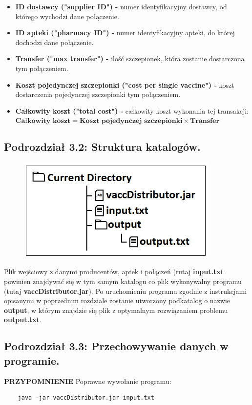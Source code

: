 \documentclass[a4paper]{article}
\newcommand\tab[1][1cm]{\hspace*{#1}}
\begin{document}
\begin{enumerate}
\begin{itemize}
              \item \textbf{ID dostawcy ("supplier ID") -} numer identyfikacyjny dostawcy, od którego wychodzi dane połączenie.
			\item \textbf{ID apteki ("pharmacy ID") -} numer identyfikacyjny apteki, do której dochodzi dane połączenie.
              \item \textbf{Transfer ("max transfer") -} ilość szczepionek, która zostanie dostarczona tym połączeniem.
			\item \textbf{Koszt pojedynczej szczepionki ("cost per single vaccine") -} koszt dostarczenia pojedynczej szczepionki tym połączeniem.
			\item \textbf{Całkowity koszt ("total cost") -} całkowity koszt wykonania tej transakcji:
							\newline			
							\newline \tab $ \textbf{Całkowity koszt} = \textbf{Koszt pojedynczej szczepionki} \times \textbf{Transfer} $
          \end{itemize}
\end{enumerate}

\subsection*{Podrozdział 3.2: Struktura katalogów.}

\begin{figure}[H]
    \includegraphics[width=10cm]{Katalogi.png}
    \centering
\end{figure}
\tab Plik wejściowy z danymi producentów, aptek i połączeń (tutaj \textbf{input.txt} powinien znajdywać się w tym samym katalogu co plik wykonywalny programu (tutaj \textbf{vaccDistributor.jar}). Po uruchomieniu programu zgodnie z instrukcjami opisanymi w poprzednim rozdziale zostanie utworzony podkatalog o nazwie \textbf{output}, w którym znajdzie się plik z optymalnym rozwiązaniem problemu \textbf{output.txt}.

\subsection*{Podrozdział 3.3: Przechowywanie danych w programie.}
\textbf{PRZYPOMNIENIE} Poprawne wywołanie programu:
\begin{lstlisting}
	java -jar vaccDistributor.jar input.txt
\end{lstlisting}
\end{document}
